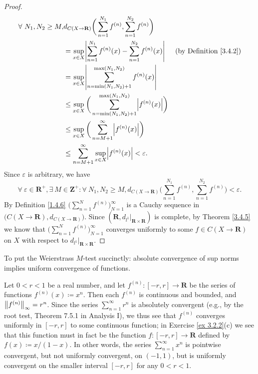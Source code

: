 \begin{proof}
\begin{align*}
        \forall\ N_1, N_2 \geq M, & d_{C(X \to \mathbf{R})}\bigg(\sum_{n = 1}^{N_1} f^{(n)}, \sum_{n = 1}^{N_2} f^{(n)}\bigg)                                             \\
                                  & = \sup_{x \in X} \abs*{\sum_{n = 1}^{N_1} f^{(n)}(x) - \sum_{n = 1}^{N_2} f^{(n)}(x)}            & \text{(by Definition \ref{3.4.2})} \\
                                  & = \sup_{x \in X} \abs*{\sum_{n = \min(N_1, N_2) + 1}^{\max(N_1, N_2)} f^{(n)}(x)}                                                     \\
                                  & \leq \sup_{x \in X} \bigg(\sum_{n = \min(N_1, N_2) + 1}^{\max(N_1, N_2)} \abs*{f^{(n)}(x)}\bigg)                                      \\
                                  & \leq \sup_{x \in X} \bigg(\sum_{n = M + 1}^\infty \abs*{f^{(n)}(x)}\bigg)                                                             \\
                                  & \leq \sum_{n = M + 1}^\infty \sup_{x \in X} \abs*{f^{(n)}(x)} < \varepsilon.
    \end{align*}
    Since \(\varepsilon\) is arbitrary, we have
    \[
        \forall\ \varepsilon \in \mathbf{R}^+, \exists\ M \in \mathbf{Z}^+ : \forall\ N_1, N_2 \geq M, d_{C(X \to \mathbf{R})}\bigg(\sum_{n = 1}^{N_1} f^{(n)}, \sum_{n = 1}^{N_2} f^{(n)}\bigg) < \varepsilon.
    \]
    By Definition \ref{1.4.6} \(\bigg(\sum_{n = 1}^N f^{(n)}\bigg)_{N = 1}^\infty\) is a Cauchy sequence in \(\big(C(X \to \mathbf{R}), d_{C(X \to \mathbf{R})}\big)\).
    Since \((\mathbf{R}, d_{l^1}|_{\mathbf{R} \times \mathbf{R}})\) is complete, by Theorem \ref{3.4.5} we know that \(\bigg(\sum_{n = 1}^N f^{(n)}\bigg)_{N = 1}^\infty\) converges uniformly to some \(f \in C(X \to \mathbf{R})\) on \(X\) with respect to \(d_{l^1}|_{\mathbf{R} \times \mathbf{R}}\).
\end{proof}

\begin{note}
    To put the Weierstrass \(M\)-test succinctly:
    absolute convergence of sup norms implies uniform convergence of functions.
\end{note}

\begin{example}\label{3.5.8}
    Let \(0 < r < 1\) be a real number, and let \(f^{(n)} : [-r, r] \to \mathbf{R}\) be the series of functions \(f^{(n)}(x) \coloneqq x^n\).
    Then each \(f^{(n)}\) is continuous and bounded, and \(\norm*{f^{(n)}}_\infty = r^n\).
    Since the series \(\sum_{n = 1}^\infty r^n\) is absolutely convergent (e.g., by the root test, Theorem 7.5.1 in Analysis I), we thus see that \(f^{(n)}\) converges uniformly in \([-r, r]\) to some continuous function;
    in Exercise \ref{ex 3.2.2}(c) we see that this function must in fact be the function \(f : [-r, r] \to \mathbf{R}\) defined by \(f(x) \coloneqq x / (1 - x)\).
    In other words, the series \(\sum_{n = 1}^\infty x^n\) is pointwise convergent, but not uniformly convergent, on \((-1, 1)\), but is uniformly convergent on the smaller interval \([-r, r]\) for any \(0 < r < 1\).
\end{example}

